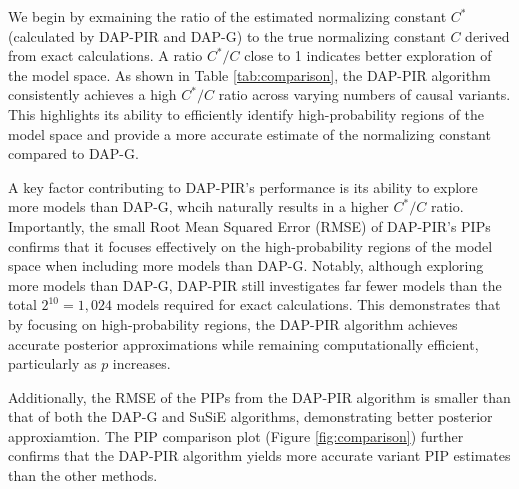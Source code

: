 \documentclass[pdflatex,sn-mathphys-num]{sn-jnl}%
\theoremstyle{thmstyleone}%
\theoremstyle{thmstyletwo}%
\theoremstyle{thmstylethree}%
\begin{document}
We begin by exmaining the ratio of the estimated normalizing constant $C^*$ (calculated by DAP-PIR and DAP-G) to the true normalizing constant $C$ derived from exact calculations. A ratio $C^*/C$ close to 1 indicates better exploration of the model space. As shown in Table \ref{tab:comparison}, the DAP-PIR algorithm consistently achieves a high $C^*/C$ ratio across varying numbers of causal variants. This highlights its ability to efficiently identify high-probability regions of the model space and provide a more accurate estimate of the normalizing constant compared to DAP-G.

A key factor contributing to DAP-PIR's performance is its ability to explore more models than DAP-G, whcih naturally results in a higher $C^*/C$ ratio. Importantly, the small Root Mean Squared Error (RMSE) of DAP-PIR's PIPs confirms that it focuses effectively on the high-probability regions of the model space when including more models than DAP-G. Notably, although exploring more models than DAP-G, DAP-PIR still investigates far fewer models than the total $2^{10}=1,024$ models required for exact calculations. This demonstrates that by focusing on high-probability regions, the DAP-PIR algorithm achieves accurate posterior approximations while remaining computationally efficient, particularly as $p$ increases.

Additionally, the RMSE of the PIPs from the DAP-PIR algorithm is smaller than that of both the DAP-G and SuSiE algorithms, demonstrating better posterior approxiamtion. The PIP comparison plot (Figure \ref{fig:comparison}) further confirms that the DAP-PIR algorithm yields more accurate variant PIP estimates than the other methods.
\end{document}
